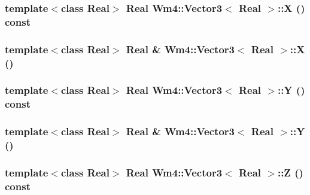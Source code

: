 \subsubsection{\setlength{\rightskip}{0pt plus 5cm}template$<$class Real$>$ Real {\bf Wm4::Vector3}$<$ Real $>$::X () const\hspace{0.3cm}{\tt  [inline]}}\label{classWm4_1_1Vector3_3854b82c9d1ebea73073c5a523abde3b}


\subsubsection{\setlength{\rightskip}{0pt plus 5cm}template$<$class Real$>$ Real \& {\bf Wm4::Vector3}$<$ Real $>$::X ()\hspace{0.3cm}{\tt  [inline]}}\label{classWm4_1_1Vector3_a63221cc2c958bdda340a7f7f08da6a8}


\subsubsection{\setlength{\rightskip}{0pt plus 5cm}template$<$class Real$>$ Real {\bf Wm4::Vector3}$<$ Real $>$::Y () const\hspace{0.3cm}{\tt  [inline]}}\label{classWm4_1_1Vector3_4d9580d763d3710cb58316d769daa6a9}


\subsubsection{\setlength{\rightskip}{0pt plus 5cm}template$<$class Real$>$ Real \& {\bf Wm4::Vector3}$<$ Real $>$::Y ()\hspace{0.3cm}{\tt  [inline]}}\label{classWm4_1_1Vector3_ed0ce037680d2e5c19df316d620b19f8}


\subsubsection{\setlength{\rightskip}{0pt plus 5cm}template$<$class Real$>$ Real {\bf Wm4::Vector3}$<$ Real $>$::Z () const\hspace{0.3cm}{\tt  [inline]}}\label{classWm4_1_1Vector3_69fce1c602b0b8568d41d05a3ef4088b}


